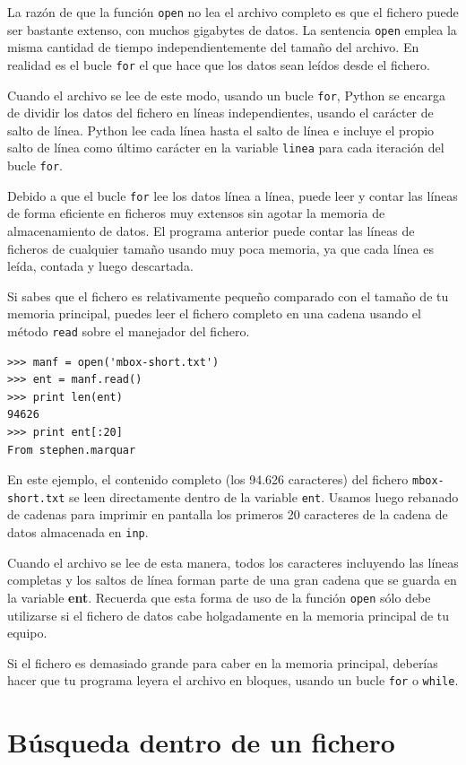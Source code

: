 La razón de que la función {\tt open} no lea el archivo completo
es que el fichero puede ser bastante extenso, con muchos gigabytes de datos.
La sentencia {\tt open} emplea la misma cantidad de tiempo independientemente del
tamaño del archivo. En realidad es el bucle {\tt for} el que hace que
los datos sean leídos desde el fichero.

Cuando el archivo se lee de este modo, usando un bucle {\tt for}, Python
se encarga de dividir los datos del fichero en líneas independientes, usando
el carácter de salto de línea. Python lee cada línea hasta el
salto de línea e incluye
el propio salto de línea como último carácter en la variable {\tt linea} para
cada iteración del bucle {\tt for}.

Debido a que el bucle {\tt for} lee los datos línea a línea, puede
leer y contar las líneas de forma eficiente en ficheros muy extensos sin
agotar la memoria de almacenamiento de datos. El programa anterior puede
contar las líneas de ficheros de cualquier tamaño usando muy poca memoria,
ya que cada línea es leída, contada y luego descartada.

Si sabes que el fichero es relativamente pequeño comparado con el tamaño de
tu memoria principal, puedes leer el fichero completo en una cadena
usando el método {\tt read} sobre el manejador del fichero.

\beforeverb
\begin{verbatim}
>>> manf = open('mbox-short.txt')
>>> ent = manf.read()
>>> print len(ent)
94626
>>> print ent[:20]
From stephen.marquar
\end{verbatim}
\afterverb
%
En este ejemplo, el contenido completo (los 94.626 caracteres)
del fichero {\tt mbox-short.txt} se leen directamente dentro de la variable
{\tt ent}. Usamos luego rebanado de cadenas para imprimir en pantalla
los primeros 20 caracteres de la cadena de datos almacenada en {\tt inp}.

Cuando el archivo se lee de esta manera, todos los caracteres incluyendo
las líneas completas y los saltos de línea forman parte de una gran cadena
que se guarda en la variable {\bf ent}.
Recuerda que esta forma de uso de la función {\tt open} sólo debe utilizarse
si el fichero de datos cabe holgadamente en la memoria principal
de tu equipo.

Si el fichero es demasiado grande para caber en la memoria principal, deberías
hacer que tu programa leyera el archivo en bloques, usando un bucle
{\tt for} o {\tt while}.

\section{Búsqueda dentro de un fichero}

